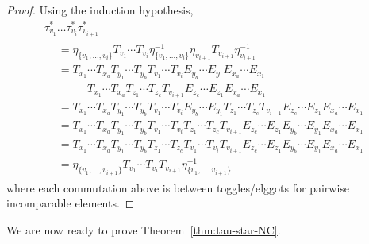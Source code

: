 \documentclass[ALCO,ThmDefs,Unicode,epreuves]{cedram}
\newcommand\mydots{\cdots}
\begin{document}
\begin{proof}
Using the induction hypothesis,
\begin{multline*}
 \tau_{v_1}^*\dots \tau_{v_i}^* \tau_{v_{i+1}}^* \\
\begin{aligned}
&=
\eta_{\{v_1,\dots,v_i\}} T_{v_1}\mydots T_{v_i} \eta_{\{v_1,\dots,v_i\}}^{-1}\eta_{v_{i+1}} T_{v_{i+1}} \eta_{v_{i+1}}^{-1}\\
&=
T_{x_1}\mydots T_{x_a} T_{y_1} \mydots T_{y_b} T_{v_1} \mydots T_{v_i} E_{y_b} \mydots E_{y_1} E_{x_a}\mydots E_{x_1}\\&\phantom{==} T_{x_1}\mydots T_{x_a} T_{z_1} \mydots T_{z_c} T_{v_{i+1}} E_{z_c} \mydots E_{z_1} E_{x_a}\mydots E_{x_1}\\
&=
T_{x_1}\mydots T_{x_a} T_{y_1} \mydots T_{y_b} T_{v_1} \mydots T_{v_i} E_{y_b} \mydots E_{y_1} T_{z_1} \mydots T_{z_c} T_{v_{i+1}} E_{z_c} \mydots E_{z_1} E_{x_a}\mydots E_{x_1}\\
&=
T_{x_1}\mydots T_{x_a} T_{y_1} \mydots T_{y_b} T_{v_1} \mydots T_{v_i} T_{z_1} \mydots T_{z_c} T_{v_{i+1}} E_{z_c} \mydots E_{z_1} E_{y_b} \mydots E_{y_1} E_{x_a}\mydots E_{x_1}\\
&=
T_{x_1}\mydots T_{x_a} T_{y_1} \mydots T_{y_b} T_{z_1} \mydots T_{z_c} T_{v_1} \mydots T_{v_i} T_{v_{i+1}} E_{z_c} \mydots E_{z_1} E_{y_b} \mydots E_{y_1} E_{x_a}\mydots E_{x_1}\\
&=
\eta_{\{v_1,\dots,v_{i+1}\}} T_{v_1}\mydots T_{v_i}
T_{v_{i+1}}\eta_{\{v_1,\dots,v_{i+1}\}}^{-1}
\end{aligned}
\end{multline*}
where each commutation above is between toggles/elggots for pairwise incomparable elements.
\end{proof}

We are now ready to prove Theorem~\ref{thm:tau-star-NC}.
\end{document}
